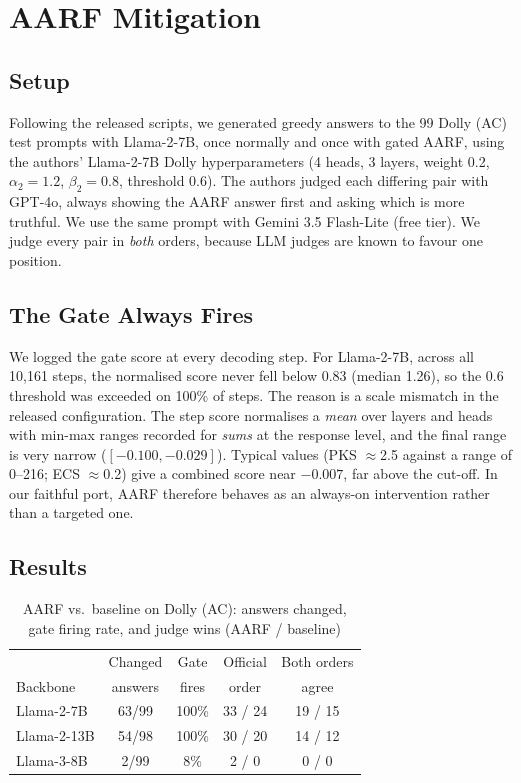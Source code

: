 \documentclass[conference]{IEEEtran}
\begin{document}
\section{AARF Mitigation}
\label{sec:aarf}
\subsection{Setup}
Following the released scripts, we generated greedy answers to the 99 Dolly (AC) test prompts with Llama-2-7B, once normally and once with gated AARF, using the authors' Llama-2-7B Dolly hyperparameters (4 heads, 3 layers, weight 0.2, $\alpha_2=1.2$, $\beta_2=0.8$, threshold 0.6). The authors judged each differing pair with GPT-4o, always showing the AARF answer first and asking which is more truthful. We use the same prompt with Gemini 3.5 Flash-Lite (free tier). We judge every pair in \emph{both} orders, because LLM judges are known to favour one position.

\subsection{The Gate Always Fires}
We logged the gate score at every decoding step. For Llama-2-7B, across all 10,161 steps, the normalised score never fell below 0.83 (median 1.26), so the 0.6 threshold was exceeded on 100\% of steps. The reason is a scale mismatch in the released configuration. The step score normalises a \emph{mean} over layers and heads with min-max ranges recorded for \emph{sums} at the response level, and the final range is very narrow ($[-0.100, -0.029]$). Typical values (PKS $\approx$2.5 against a range of 0--216; ECS $\approx$0.2) give a combined score near $-0.007$, far above the cut-off. In our faithful port, AARF therefore behaves as an always-on intervention rather than a targeted one.

\subsection{Results}
\begin{table}[t]
\caption{AARF vs.\ baseline on Dolly (AC): answers changed, gate firing rate, and judge wins (AARF / baseline)}
\label{tab:aarf}
\centering\footnotesize
\setlength{\tabcolsep}{3pt}
\begin{tabular}{@{}lcccc@{}}
\toprule
& Changed & Gate & Official & Both orders \\
Backbone & answers & fires & order & agree \\
\midrule
Llama-2-7B & 63/99 & 100\% & 33 / 24 & 19 / 15 \\
Llama-2-13B & 54/98 & 100\% & 30 / 20 & 14 / 12 \\
Llama-3-8B & 2/99 & 8\% & 2 / 0 & 0 / 0 \\
\bottomrule
\end{tabular}
\end{table}
\end{document}
